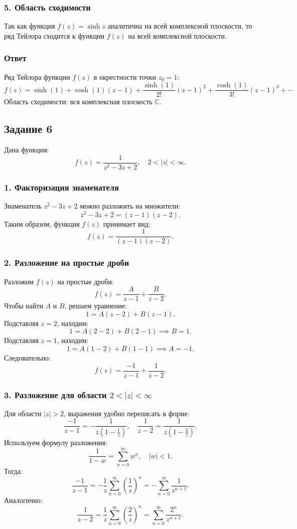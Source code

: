 \documentclass[a4paper,12pt]{article}
\begin{document}
\subsubsection*{5. Область сходимости}
Так как функция \( f(z) = \sinh z \) аналитична на всей комплексной плоскости, то ряд Тейлора сходится к функции \( f(z) \) на всей комплексной плоскости.

\subsubsection*{Ответ}
Ряд Тейлора функции \( f(z) \) в окрестности точки \( z_0 = 1 \):
\[
f(z) = \sinh(1) + \cosh(1)(z-1) + \frac{\sinh(1)}{2!}(z-1)^2 + \frac{\cosh(1)}{3!}(z-1)^3 + \cdots
\]
Область сходимости: вся комплексная плоскость \( \mathbb{C} \).

\subsection*{Задание 6}

Дана функция:
\[
f(z) = \frac{1}{z^2 - 3z + 2}, \quad 2 < |z| < \infty.
\]

\subsubsection*{1. Факторизация знаменателя}
Знаменатель \( z^2 - 3z + 2 \) можно разложить на множители:
\[
z^2 - 3z + 2 = (z - 1)(z - 2).
\]
Таким образом, функция \( f(z) \) принимает вид:
\[
f(z) = \frac{1}{(z - 1)(z - 2)}.
\]

\subsubsection*{2. Разложение на простые дроби}
Разложим \( f(z) \) на простые дроби:
\[
f(z) = \frac{A}{z - 1} + \frac{B}{z - 2}.
\]
Чтобы найти \( A \) и \( B \), решаем уравнение:
\[
1 = A(z - 2) + B(z - 1).
\]
Подставляя \( z = 2 \), находим:
\[
1 = A(2 - 2) + B(2 - 1) \implies B = 1.
\]
Подставляя \( z = 1 \), находим:
\[
1 = A(1 - 2) + B(1 - 1) \implies A = -1.
\]
Следовательно:
\[
f(z) = \frac{-1}{z - 1} + \frac{1}{z - 2}.
\]

\subsubsection*{3. Разложение для области \( 2 < |z| < \infty \)}
Для области \( |z| > 2 \), выражения удобно переписать в форме:
\[
\frac{-1}{z - 1} = -\frac{1}{z \left( 1 - \frac{1}{z} \right)}, \quad \frac{1}{z - 2} = \frac{1}{z \left( 1 - \frac{2}{z} \right)}.
\]
Используем формулу разложения:
\[
\frac{1}{1 - w} = \sum_{n=0}^\infty w^n, \quad |w| < 1.
\]
Тогда:
\[
\frac{-1}{z - 1} = -\frac{1}{z} \sum_{n=0}^\infty \left( \frac{1}{z} \right)^n = -\sum_{n=0}^\infty \frac{1}{z^{n+1}}.
\]
Аналогично:
\[
\frac{1}{z - 2} = \frac{1}{z} \sum_{n=0}^\infty \left( \frac{2}{z} \right)^n = \sum_{n=0}^\infty \frac{2^n}{z^{n+1}}.
\]
\end{document}
